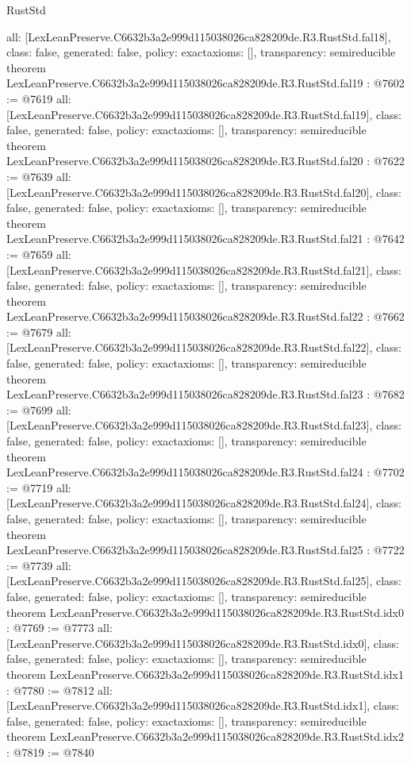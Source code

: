 \begin{lexlean}{RustStd}
\begin{coremodule}
{  all: [LexLeanPreserve.C6632b3a2e999d115038026ca828209de.R3.RustStd.fal18],
  class: false,
  generated: false,
  policy: exact{axioms: []},
  transparency: semireducible
}
theorem LexLeanPreserve.C6632b3a2e999d115038026ca828209de.R3.RustStd.fal19 : @7602 := @7619 {
  all: [LexLeanPreserve.C6632b3a2e999d115038026ca828209de.R3.RustStd.fal19],
  class: false,
  generated: false,
  policy: exact{axioms: []},
  transparency: semireducible
}
theorem LexLeanPreserve.C6632b3a2e999d115038026ca828209de.R3.RustStd.fal20 : @7622 := @7639 {
  all: [LexLeanPreserve.C6632b3a2e999d115038026ca828209de.R3.RustStd.fal20],
  class: false,
  generated: false,
  policy: exact{axioms: []},
  transparency: semireducible
}
theorem LexLeanPreserve.C6632b3a2e999d115038026ca828209de.R3.RustStd.fal21 : @7642 := @7659 {
  all: [LexLeanPreserve.C6632b3a2e999d115038026ca828209de.R3.RustStd.fal21],
  class: false,
  generated: false,
  policy: exact{axioms: []},
  transparency: semireducible
}
theorem LexLeanPreserve.C6632b3a2e999d115038026ca828209de.R3.RustStd.fal22 : @7662 := @7679 {
  all: [LexLeanPreserve.C6632b3a2e999d115038026ca828209de.R3.RustStd.fal22],
  class: false,
  generated: false,
  policy: exact{axioms: []},
  transparency: semireducible
}
theorem LexLeanPreserve.C6632b3a2e999d115038026ca828209de.R3.RustStd.fal23 : @7682 := @7699 {
  all: [LexLeanPreserve.C6632b3a2e999d115038026ca828209de.R3.RustStd.fal23],
  class: false,
  generated: false,
  policy: exact{axioms: []},
  transparency: semireducible
}
theorem LexLeanPreserve.C6632b3a2e999d115038026ca828209de.R3.RustStd.fal24 : @7702 := @7719 {
  all: [LexLeanPreserve.C6632b3a2e999d115038026ca828209de.R3.RustStd.fal24],
  class: false,
  generated: false,
  policy: exact{axioms: []},
  transparency: semireducible
}
theorem LexLeanPreserve.C6632b3a2e999d115038026ca828209de.R3.RustStd.fal25 : @7722 := @7739 {
  all: [LexLeanPreserve.C6632b3a2e999d115038026ca828209de.R3.RustStd.fal25],
  class: false,
  generated: false,
  policy: exact{axioms: []},
  transparency: semireducible
}
theorem LexLeanPreserve.C6632b3a2e999d115038026ca828209de.R3.RustStd.idx0 : @7769 := @7773 {
  all: [LexLeanPreserve.C6632b3a2e999d115038026ca828209de.R3.RustStd.idx0],
  class: false,
  generated: false,
  policy: exact{axioms: []},
  transparency: semireducible
}
theorem LexLeanPreserve.C6632b3a2e999d115038026ca828209de.R3.RustStd.idx1 : @7780 := @7812 {
  all: [LexLeanPreserve.C6632b3a2e999d115038026ca828209de.R3.RustStd.idx1],
  class: false,
  generated: false,
  policy: exact{axioms: []},
  transparency: semireducible
}
theorem LexLeanPreserve.C6632b3a2e999d115038026ca828209de.R3.RustStd.idx2 : @7819 := @7840 {
}
\end{coremodule}
\end{lexlean}

